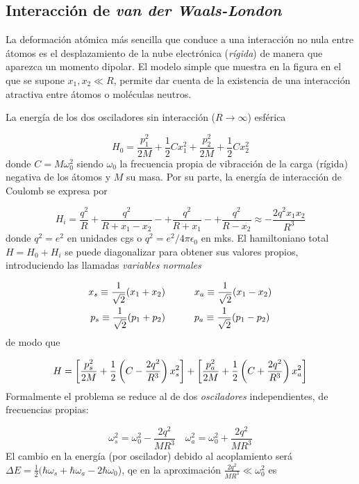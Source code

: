 \subsection{Interacción de \textit{van der Waals-London}}

La deformación atómica más sencilla que conduce a una interacción no nula entre átomos es el desplazamiento de la nube electrónica (\textit{rígida}) de manera que aparezca un momento dipolar. El modelo simple que muestra en la figura en el que se supone $x_1,x_2\ll R$, permite dar cuenta de la existencia de una interacción atractiva entre átomos o moléculas neutros. 

La energía de los dos osciladores sin interacción ($R\rightarrow \infty$) esférica

\begin{equation}
    H_0 = \frac{p_1^2}{2M} + \frac{1}{2} Cx_1^2 + \frac{p_2^2}{2M} + \frac{1}{2} Cx_2^2
\end{equation}
donde $C=M\omega_0^2$ siendo $\omega_0$ la frecuencia propia de vibracción de la carga (rígida) negativa de los átomos y $M$ su masa. Por su parte, la energía de interacción de Coulomb se expresa por 

\begin{equation}
    H_i = \frac{q^2}{R} + \frac{q^2}{R+x_1-x_2} - + \frac{q^2}{R+x_1} - + \frac{q^2}{R-x_2} \approx - \frac{2q^2x_1x_2}{R^3}
\end{equation}
donde $q^2=e^2$ en unidades cgs o $q^2 = e^2 / 4\pi \epsilon_0$ en mks. El hamiltoniano total $H=H_0+H_i$ se puede diagonalizar para obtener sus valores propios, introduciendo las llamadas {\it variables normales}

\begin{align}
    x_s \equiv \frac{1}{\sqrt{2}} (x_1 + x_2)  \quad \quad \quad  & x_a \equiv \frac{1}{\sqrt{2}} (x_1-x_2) \\
    p_s \equiv \frac{1}{\sqrt{2}} (p_1 + p_2) \quad \quad \quad & p_a \equiv \frac{1}{\sqrt{2}} (p_1-p_2) 
\end{align}
de modo que 

\begin{equation}
    H = \left[ \frac{p_s^2}{2M}+ \frac{1}{2} \left( C- \frac{2q^2}{R^3} \right)x_s^2 \right] + \left[ \frac{p_a^2}{2M}+ \frac{1}{2} \left( C+ \frac{2q^2}{R^3} \right)x_a^2 \right] 
\end{equation}
Formalmente el problema se reduce al de dos \textit{osciladores} independientes, de frecuencias propias:

\begin{equation}
\omega_s^2 = \omega_0^2 - \frac{2q^2}{MR^3} \quad \omega_a^2 = \omega_0^2 + \frac{2q^2}{MR^3}
\end{equation}
El cambio en la energía (por oscilador) debido al acoplamiento será $\Delta E = \frac{1}{2} (\hbar \omega_s + \hbar \omega_a - 2 \hbar \omega_0$), qe en la aproximación  $ \frac{2q^2}{MR^3} \ll \omega_0^2$ es

